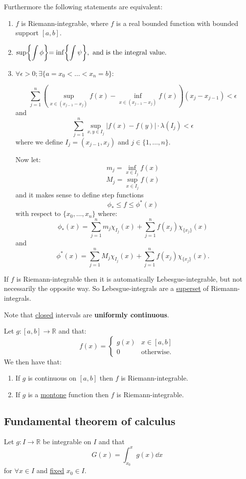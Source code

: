 \documentclass{article}
\begin{document}
Furthermore the following statements are equivalent:
\begin{enumerate}
    \item $f$ is Riemann-integrable, where $f$ is a real bounded function with bounded support $[a,b]$.

    \item $\sup\biggl\{\displaystyle\int\phi\biggl\}=\inf\biggl\{\displaystyle\int\psi\biggl\},
    \hspace{0.05in}\text{and is the integral value.}$

    \item $\forall\epsilon>0;\exists\{a=x_0<\dots<x_n=b\}:$

    $$\sum_{j=1}^{n}\left(\sup_{x\in(x_{j-1}-x_j)}f(x)-\inf_{x\in(x_{j-1}-x_j)}f(x)\right)(x_j-x_{j-1})
    <\epsilon$$
    and
    $$\sum_{j=1}^{n}\sup_{x,y\in I_j}|f(x)-f(y)|\cdot\lambda(I_j)<\epsilon$$
    where we define $I_j=(x_{j-1},x_j)$ and $j\in\{1,\dots,n\}$.
    
    Now let:
    $$m_j=\inf_{x\in I_j} f(x)$$
    $$M_j=\sup_{x\in I_j} f(x)$$
    and it makes sense to define step functions
    $$\phi_{*}\leq f\leq\phi^*(x)$$
    with respect to $\{x_0,\dots,x_n\}$ where:
    $$\phi_{*}(x)=\sum_{j=1}^{n}m_j\chi_{I_j}(x)
    +\sum_{j=1}^{n}f(x_j)\chi_{\{x_j\}}(x)$$
    and
    $$\phi^*(x)=\sum_{j=1}^{n}M_j\chi_{I_j}(x)
    +\sum_{j=1}^{n}f(x_j)\chi_{\{x_j\}}(x).$$
\end{enumerate}

If $f$ is Riemann-integrable then it is automatically Lebesgue-integrable, but not necessarily the opposite way.
So Lebesgue-integrals are a \underline{superset} of Riemann-integrals.

\newpage

Note that \underline{closed} intervals are \textbf{uniformly continuous}.

Let $g:[a,b]\rightarrow\mathbb{R}$ and that:
$$f(x) =
\left\{
\begin{array}{ll}
	g(x)  &  x\in[a,b] \\
	0 & \mbox{otherwise.}
\end{array}
\right.$$
We then have that:
\begin{enumerate}
    \item If $g$ is continuous on $[a,b]$ then $f$ is Riemann-integrable.
    \item If $g$ is a \underline{montone} function then $f$ is Riemann-integrable.
\end{enumerate}

\subsection{Fundamental theorem of calculus}
Let $g:I\rightarrow\mathbb{R}$ be integrable on $I$ and that
$$G(x)=\int_{x_0}^{x}g(x)\dd x$$
for $\forall x\in I$ and \underline{fixed} $x_0\in I$.
\end{document}
